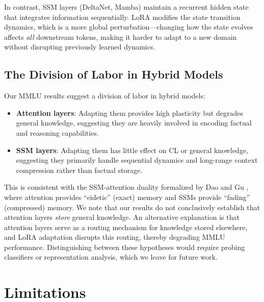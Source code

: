 \documentclass{article}
\begin{document}
In contrast, SSM layers (DeltaNet, Mamba) maintain a recurrent hidden state that integrates information sequentially. LoRA modifies the state transition dynamics, which is a more global perturbation---changing how the state evolves affects \emph{all} downstream tokens, making it harder to adapt to a new domain without disrupting previously learned dynamics.

\subsection{The Division of Labor in Hybrid Models}

Our MMLU results suggest a division of labor in hybrid models:
\begin{itemize}
    \item \textbf{Attention layers}: Adapting them provides high plasticity but degrades general knowledge, suggesting they are heavily involved in encoding factual and reasoning capabilities.
    \item \textbf{SSM layers}: Adapting them has little effect on CL or general knowledge, suggesting they primarily handle sequential dynamics and long-range context compression rather than factual storage.
\end{itemize}

This is consistent with the SSM-attention duality formalized by Dao and Gu \cite{dao2024mamba2}, where attention provides ``eidetic'' (exact) memory and SSMs provide ``fading'' (compressed) memory. We note that our results do not conclusively establish that attention layers \emph{store} general knowledge. An alternative explanation is that attention layers serve as a routing mechanism for knowledge stored elsewhere, and LoRA adaptation disrupts this routing, thereby degrading MMLU performance. Distinguishing between these hypotheses would require probing classifiers or representation analysis, which we leave for future work.

\section{Limitations}
\end{document}
